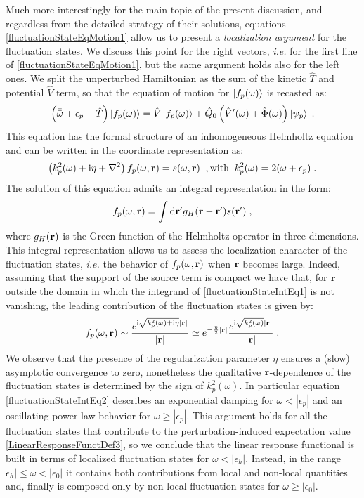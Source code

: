 \documentclass[a4paper]{article}
\newcommand{\dd}{{\rm d}}
\renewcommand{\r}{{\bf r}}
\newcommand{\eps}{\epsilon}
\newcommand{\bomega}{\bar\omega}
\newcommand{\bbomega}{\bar{\bomega}}
\newcommand{\ii}{\mathrm{i}}
\newcommand{\be}{\begin{equation}}
\newcommand{\ee}{\end{equation}}
\newcommand{\lb}{\label}
\newcommand{\op}[1]{\hat {#1}}
\begin{document}
Much more interestingly for the main topic of the present discussion, and regardless from the detailed strategy of their solutions, equations \eqref{fluctuationStateEqMotion1} 
allow us to present a \emph{localization argument} for the fluctuation states. We discuss this point for the right vectors, \emph{i.e.} for the first line of \eqref{fluctuationStateEqMotion1}, 
but the same argument holds also for the left ones. We split the unperturbed Hamiltonian as the sum of the kinetic $\op T$ and potential $\op V$ term, so that the equation of motion 
for $\ket{f_p(\omega)}$ is recasted as:
\be\lb{fluctuationStateEqMotion}
\left(\bbomega+\eps_p -\op T\right)\ket{f_p(\omega)} = \op V\ket{f_p(\omega)} + \op Q_0\left(\op V'(\omega) + \op \Phi(\omega)\right)\ket{\psi_p} \;.
\ee
This equation has the formal structure of an inhomogeneous Helmholtz equation and can be written in the coordinate representation as:
\be
\left(k^2_p(\omega)+\ii\eta + \nabla^2\right)f_p(\omega,\r) = s(\omega,\r) \;\;, {\rm with} \;\; k^2_p(\omega) = 2(\omega+\eps_p) \;.
\ee
The solution of this equation admits an integral representation in the form:
\be\lb{fluctuationStateIntEq1}
f_p(\omega,\r) = \int \dd\r' g_H(\r-\r')s(\r') \;,
\ee
where $g_H(\r)$ is the Green function of the Helmholtz operator in three dimensions. This integral representation allows us to assess the localization character 
of the fluctuation states, \emph{i.e.} the behavior of $f_p(\omega,\r)$ when $\r$ becomes large. Indeed, assuming that the support of the source term is compact
we have that, for $\r$ outside the domain in which the integrand of \eqref{fluctuationStateIntEq1} is not vanishing, the leading contribution of the fluctuation states
is given by:
\be\lb{fluctuationStateIntEq2}
f_p(\omega,\r) \sim \frac{e^{\ii \sqrt{k^2_p(\omega)+\ii\eta} |\r|}}{|\r|} \simeq 
e^{-\frac{\eta}{2}|\r|} \frac{e^{\ii \sqrt{k^2_p(\omega)} |\r|}}{|\r|} \;.
\ee
We observe that the presence of the regularization parameter $\eta$ ensures a (slow) asymptotic convergence to zero, nonetheless the qualitative $\r$-dependence of the fluctuation 
states is determined by the sign of $k^2_p(\omega)$. In particular equation \eqref{fluctuationStateIntEq2} describes an exponential damping for $\omega < |\eps_p|$ and an oscillating 
power law behavior for $\omega \geq |\eps_p|$.
This argument holds for all the fluctuation states that contribute to the perturbation-induced expectation value \eqref{LinearResponseFunctDef3}, so we conclude that
the linear response functional is built in terms of localized fluctuation states for $\omega < |\eps_h|$. Instead, in the range $\eps_h|\leq\omega<|\eps_0|$ it contains both
contributions from local and non-local quantities and, finally is composed only by non-local fluctuation states for $\omega\geq|\eps_0|$. 
\end{document}
